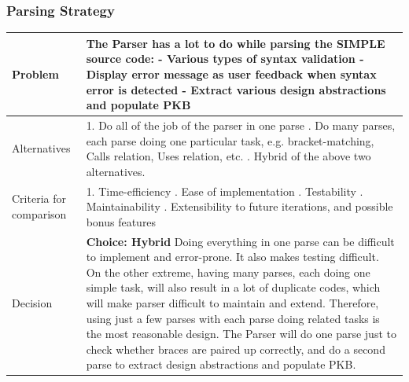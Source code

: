 \documentclass[12pt]{article}
\begin{document}
{{{{{{{{{{{{{\subsubsection{Parsing Strategy}
\begin{tabular}{|L{5cm} | L{12cm}| }
\hline
Problem &
The Parser has a lot to do while parsing the SIMPLE source code:\newline
- Various types of syntax validation
\newline - Display error message as user feedback when syntax error is detected
\newline - Extract various design abstractions and populate PKB
 \\
    \hline
    Alternatives &
1. Do all of the job of the parser in one parse
. Do many parses, each parse doing one particular task, e.g. bracket-matching, Calls relation, Uses relation, etc.
. Hybrid of the above two alternatives. \\
\hline
    Criteria for comparison &
1. Time-efficiency
. Ease of implementation
. Testability
. Maintainability
. Extensibility to future iterations, and possible bonus features 
 \\
 \hline
   Decision & \textbf{Choice: Hybrid}
\newline
Doing everything in one parse can be difficult to implement and error-prone. It also makes testing difficult. On the other extreme, having many parses, each doing one simple task, will also result in a lot of duplicate codes, which will make parser difficult to maintain and extend.
\newline
Therefore, using just a few parses with each parse doing related tasks is the most reasonable design. The Parser will do one parse just to check whether braces are paired up correctly, and do a second parse to extract design abstractions and populate PKB.
 \\
 \hline
\end{tabular}
}}}}}}}}}}}}}
\end{document}
